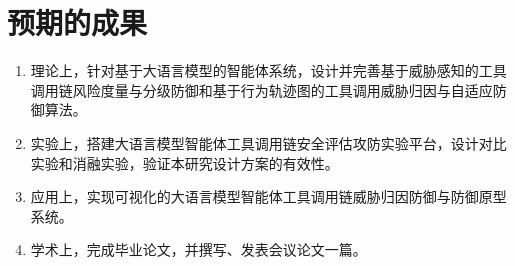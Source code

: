 \section{预期的成果}
\begin{enumerate}
  \item 理论上，针对基于大语言模型的智能体系统，设计并完善基于威胁感知的工具调用链风险度量与分级防御和基于行为轨迹图的工具调用威胁归因与自适应防御算法。
  \item 实验上，搭建大语言模型智能体工具调用链安全评估攻防实验平台，设计对比实验和消融实验，验证本研究设计方案的有效性。
  \item 应用上，实现可视化的大语言模型智能体工具调用链威胁归因防御与防御原型系统。
  \item 学术上，完成毕业论文，并撰写、发表会议论文一篇。
\end{enumerate}